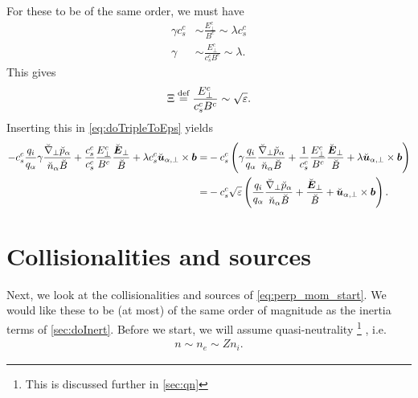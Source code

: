 %
For these to be of the same order, we must have
%
\begin{align*}
    \gamma c^c_s &\sim \frac{E_\perp^c}{B^c} \sim \lambda c^c_s \\
    \gamma     &\sim \frac{E_\perp^c}{c^c_sB^c} \sim \lambda.
\end{align*}
%
This gives
%
\begin{align*}
    \Xi \overset{\text{def}}{=} \frac{E_\perp^c}{c^c_sB^c} \sim \sqrt{\varepsilon}.
\end{align*}
%
Inserting this in \cref{eq:doTripleToEps} yields
%
\begin{align*}
-
c^c_s
\frac{q_i}{q_\a}
\gamma
\frac{ \breve{\grad}_\perp \breve{p}_\a }{\breve{n}_\a \breve{B}}
+ \frac{c^c_s}{c^c_s}\frac{E_\perp^c}{B^c}
\frac{\breve{\ve{E}}_\perp}{\breve{B}}
+\lambda c^c_s
\breve{\ve{u}}_{\a,\perp}\times\ve{b}
=&
-
c^c_s
\L(
\gamma
\frac{q_i}{q_\a}
\frac{ \breve{\grad}_\perp \breve{p}_\a }{\breve{n}_\a \breve{B}}
+ \frac{1}{c^c_s}\frac{E_\perp^c}{B^c}
\frac{\breve{\ve{E}}_\perp}{\breve{B}}
+\lambda
\breve{\ve{u}}_{\a,\perp}\times\ve{b}
\R)
\\
%
%
=&
-
c^c_s
\sqrt{\e}
\L(
\frac{q_i}{q_\a}
\frac{ \breve{\grad}_\perp \breve{p}_\a }{\breve{n}_\a \breve{B}}
+
\frac{\breve{\ve{E}}_\perp}{\breve{B}}
+
\breve{\ve{u}}_{\a,\perp}\times\ve{b}
\R).
\end{align*}

\section{Collisionalities and sources}
%
Next, we look at the collisionalities and sources of \cref{eq:perp_mom_start}.
We would like these to be (at most) of the same order of magnitude as the inertia terms of \cref{sec:doInert}.
Before we start, we will assume quasi-neutrality%
\footnote{This is discussed further in \cref{sec:qn}}%
%
, i.e.
%
\begin{align*}
    n\sim n_e \sim Zn_i.
\end{align*}
%

